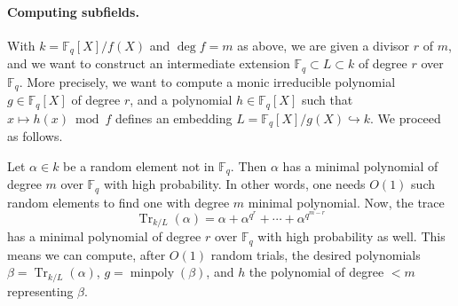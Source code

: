 \documentclass[12pt]{article}
\theoremstyle{plain}
\theoremstyle{definition}
\DeclareMathOperator{\trace}{Tr} %
\DeclareMathOperator{\minpoly}{minpoly}
\def\F{\ensuremath{\mathbb{F}}}
\begin{document}
\paragraph{Computing subfields.}
With $k = \F_q[X]/f(X)$ and $\deg f=m$ as above, we are given a
divisor $r$ of $m$, and we want to construct an intermediate extension
$\F_q \subset L \subset k$ of degree $r$ over $\F_q$. More precisely,
we want to compute a monic irreducible polynomial $g \in \F_q[X]$ of
degree $r$, and a polynomial $h \in \F_q[X]$ such that
$x \mapsto h(x)\bmod f$ defines an embedding
$L = \F_q[X] / g(X) \hookrightarrow k$. We proceed as follows.

Let $\alpha\in k$ be a random element not in $\F_q$. Then $\alpha$ has a minimal polynomial of degree $m$ 
over $\F_q$ with high probability. In other words, one needs $O(1)$ such random elements to find 
one with degree $m$ minimal polynomial. Now, the trace
\begin{equation}
	\label{equ:trace-simple}
	\trace_{k/L}(\alpha) = \alpha + \alpha^{q^r} + \cdots + \alpha^{q^{m - r}}
\end{equation}
has a minimal polynomial of degree $r$ over $\F_q$ with high
probability as well. This means we can compute, after $O(1)$ random
trials, the desired polynomials $\beta = \trace_{k/L}(\alpha)$,
$g = \minpoly(\beta)$, and $h$ the polynomial of degree $<m$ representing $\beta$.
\end{document}
